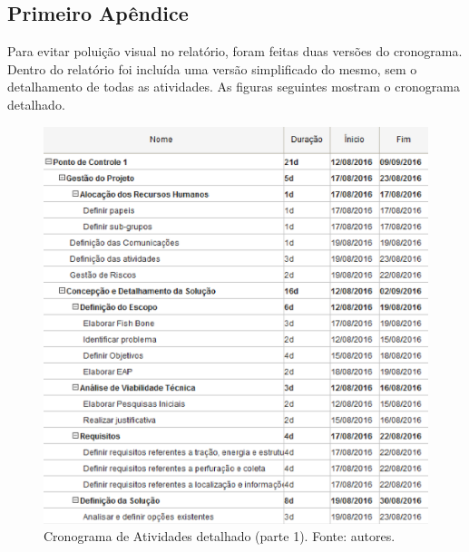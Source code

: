 \begin{apendicesenv}
\partapendices

\chapter{Primeiro Apêndice}
\label{schedule_ap}

Para evitar poluição visual no relatório, foram feitas duas versões do cronograma.
Dentro do relatório foi incluída uma versão simplificado do mesmo, sem o detalhamento de todas as atividades.
As figuras seguintes mostram o cronograma detalhado.

\begin{figure}[!htbp]
  \centering
  \includegraphics[width=\textwidth]{figuras/cronograma_det_1.eps}
  \caption{Cronograma de Atividades detalhado (parte 1). Fonte: autores.}
  \label{fig:cron_d1}
\end{figure}

\vfill
\pagebreak


\end{apendicesenv}
